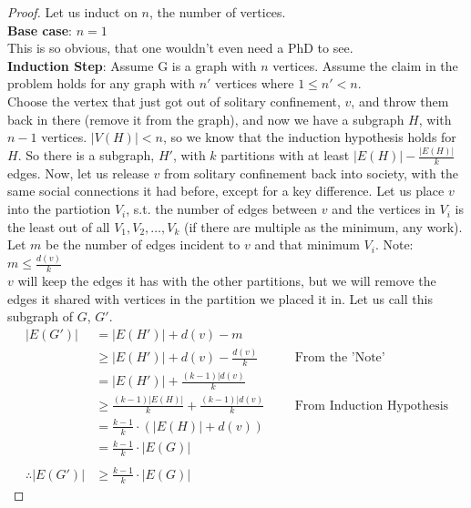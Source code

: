 \documentclass[12pt]{article}
\begin{document}
\begin{enumerate}
\begin{proof}
	Let us induct on $n$, the number of vertices.\\
	\textbf{Base case}: $n=1$\\
	This is so obvious, that one wouldn't even need a PhD to see.\\
	\textbf{Induction Step}: Assume G is a graph with $n$ vertices. Assume the claim in the problem holds for any graph with $n'$ vertices where $1\leq n'<n$.\\
	Choose the vertex that just got out of solitary confinement, $v$, and throw them back in there (remove it from the graph), and now we have a subgraph $H$, with $n-1$ vertices. $|V(H)| < n$, so we know that the induction hypothesis holds for $H$. So there is a subgraph, $H'$, with $k$ partitions with at least
	$|E(H)|-\frac{|E(H)|}{k}$ edges. Now, let us release $v$ from solitary confinement back into society, with the same social connections it had before, except for a key difference. Let us place $v$ into the partiotion $V_i$, s.t. the number of edges between $v$ and the vertices in $V_i$ is the least out of all $V_1,V_2,\ldots,V_k$ (if there are multiple as the minimum, any work). Let $m$ be the number of edges incident to $v$ and that minimum $V_i$. Note: $m\leq \frac{d(v)}{k}$\\
	$v$ will keep the edges it has with the other partitions, but we will remove the edges it shared with vertices in the partition we placed it in. Let us call this subgraph of $G$, $G'$.
	\begin{align*}
		|E(G')| &= |E(H')|+d(v)-m\\
		&\geq |E(H')|+d(v)-\frac{d(v)}{k} &&&\text{From the 'Note'}\\
		&=|E(H')| + \frac{(k-1)|d(v)}{k}\\
		&\geq\frac{(k-1)|E(H)|}{k} + \frac{(k-1)|d(v)}{k} &&& \text{From Induction Hypothesis}\\
		&=\frac{k-1}{k}\cdot(|E(H)|+d(v))\\
		&=\frac{k-1}{k}\cdot |E(G)|\\\\
		\therefore |E(G')| &\geq \frac{k-1}{k}\cdot |E(G)|
	\end{align*} 
\end{proof}


\medskip


\end{enumerate}
\end{document}
